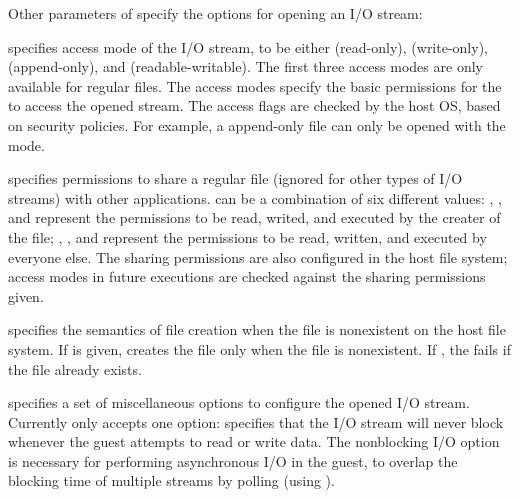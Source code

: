 Other parameters of  specify the options for opening an I/O stream:

\begin{compactitem}

\item
{} specifies access mode of the I/O stream, to be either  (read-only),  (write-only),  (append-only), and  (readable-writable).
The first three access modes are only available
for regular files. %
The access modes specify the basic permissions for the \libos{} to access the opened stream. %
The access flags are checked by the host OS, based on security policies.
For example, a append-only file can only be opened with the  mode.

\item
{} specifies permissions to share a regular file (ignored for other types of  I/O streams)
with other applications. %
 can be a combination of six different values:
, , and 
represent the permissions to be read, writed, and executed by the creater of the file;
, , and 
represent the permissions to be read, written, and executed by everyone else.
The sharing permissions are also configured in the host file system; access modes in future executions are checked against the sharing permissions given.

\item
{} specifies the semantics of file creation
when the file is nonexistent on the host file system.
If  is given,
 creates the file only when the file is nonexistent.
If ,
the \hostapi{} fails if the file already exists.

\item
{} specifies a set of miscellaneous options to configure the opened I/O stream.
Currently  only accepts one option:  specifies that the I/O stream will never block whenever the guest attempts to read or write data.
The nonblocking I/O option is necessary for performing asynchronous I/O in the guest, to overlap the blocking time of multiple streams by polling (using ).

\end{compactitem}


